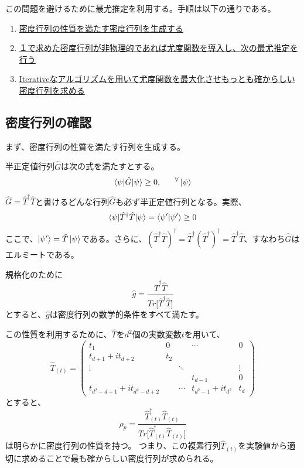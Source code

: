 \documentclass[11pt,a4j,notitlepage]{jreport}
\begin{document}
	この問題を避けるために最尤推定を利用する。手順は以下の通りである。

	\begin{enumerate}
		\item \underline{密度行列の性質を満たす密度行列を生成する}
		\item \underline{１で求めた密度行列が非物理的であれば尤度関数を導入し、次の最尤推定を行う}
		\item \underline{Iterativeなアルゴリズムを用いて尤度関数を最大化させもっとも確からしい密度行列を求める}
	\end{enumerate}


	\subsection{密度行列の確認}

	まず、密度行列の性質を満たす行列を生成する。

	半正定値行列$\hat{G}$は次の式を満たすとする。
	\begin{equation}
		\braket{\psi | \hat{G} | \psi} \geq 0,\ \ \ \ \ ^\forall \ket{\psi}
	\end{equation}
	$\hat{G} = \hat{T}^\dagger \hat{T}$と書けるどんな行列$\hat{G}$も必ず半正定値行列となる。実際、
	\begin{equation}
		\braket{\psi | \hat{T}^\dagger \hat{T} | \psi} = \braket{\psi' | \psi'} \geq 0
	\end{equation}
	ここで、$\ket{\psi'} = \hat{T} \ket{\psi}$である。さらに、$(\hat{T}^\dagger \hat{T})^\dagger = \hat{T}^\dagger (\hat{T}^\dagger)^\dagger = \hat{T}^\dagger \hat{T}$、すなわち$\hat{G}$はエルミートである。

	規格化のために
	\begin{equation}
		\hat{g} = \frac{\hat{T}^\dagger \hat{T}}{Tr \big[ \hat{T}^\dagger \hat{T} \big] } 
	\end{equation}
	とすると、$\hat{g}$は密度行列の数学的条件をすべて満たす。

	この性質を利用するために、$\hat{T}$を$d^2$個の実数変数$t$を用いて、
	\begin{equation}
		\hat{T}_{(t)} = \begin{pmatrix}
			t_1 & 0 & & \cdots & 0 \\
			t_{d+1} + it_{d+2} & t_2 & & & \\
			\vdots & & \ddots &  & \vdots \\
			& & & t_{d-1} & 0 \\
			t_{d^2 - d + 1} + it_{d^2 - d + 2} & & \cdots & t_{d^2 - 1} + it_{d^2} & t_d
		\end{pmatrix}
	\end{equation}
	とすると、
	\begin{equation}
		\hat{\rho}_p = \frac{\hat{T}^\dagger_{(t)} \hat{T}_{(t)}}{Tr \big[ \hat{T}^\dagger_{(t)} \hat{T}_{(t)} \big] }
	\end{equation}
	は明らかに密度行列の性質を持つ。
	つまり、この複素行列$\hat{T}_{(t)}$を実験値から適切に求めることで最も確からしい密度行列が求められる。
\end{document}

